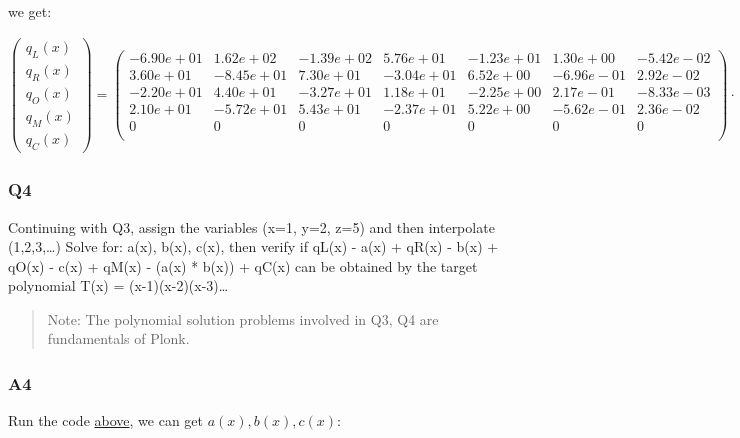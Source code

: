 \documentclass[11pt]{article}
\begin{document}
we get:

\(\begin{pmatrix} q_L(x)\\q_R(x)\\q_O(x)\\q_M(x)\\q_C(x) \end{pmatrix} = \begin{pmatrix} -6.90e+01& 1.62e+02& -1.39e+02& 5.76e+01& -1.23e+01& 1.30e+00& -5.42e-02 \\ 3.60e+01& -8.45e+01& 7.30e+01& -3.04e+01& 6.52e+00& -6.96e-01& 2.92e-02 \\ -2.20e+01& 4.40e+01& -3.27e+01& 1.18e+01& -2.25e+00& 2.17e-01& -8.33e-03 \\ 2.10e+01& -5.72e+01& 5.43e+01& -2.37e+01& 5.22e+00& -5.62e-01& 2.36e-02 \\ 0&0&0&0&0&0&0 \\ \end{pmatrix} \cdot \begin{pmatrix} 1\\x\\x^2\\x^3\\x^4\\x^5\\x^6 \end{pmatrix}\)

\subsubsection{Q4}
\label{q4}
Continuing with Q3, assign the variables (x=1, y=2, z=5) and then interpolate (1,2,3,\ldots{}) Solve for: a(x), b(x), c(x), then verify if qL(x) - a(x) + qR(x) - b(x) + qO(x) - c(x) + qM(x) - (a(x) * b(x)) + qC(x) can be obtained by the target polynomial T(x) = (x-1)(x-2)(x-3)\ldots{}

\begin{quote}
Note: The polynomial solution problems involved in Q3, Q4 are fundamentals of Plonk.
\end{quote}

\subsubsection{A4}
\label{a4}
Run the code \href{https://www.notion.so/Week-2-b3d4c277e0b94346a235c0fc81381dac}{above}, we can get \(a(x),b(x),c(x)\):
\end{document}
